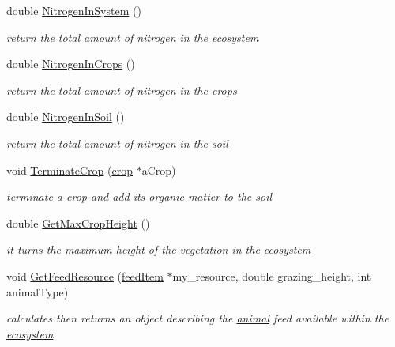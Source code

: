 \begin{DoxyCompactItemize}
double \hyperlink{classecosystem_acfb7342a6031a4451c885cf8ee9b365e}{NitrogenInSystem} ()
\begin{DoxyCompactList}\small\item\em return the total amount of \hyperlink{classnitrogen}{nitrogen} in the \hyperlink{classecosystem}{ecosystem} \item\end{DoxyCompactList}\item 
double \hyperlink{classecosystem_a37510ceb9f78738a84d1155ffa592f12}{NitrogenInCrops} ()
\begin{DoxyCompactList}\small\item\em return the total amount of \hyperlink{classnitrogen}{nitrogen} in the crops \item\end{DoxyCompactList}\item 
double \hyperlink{classecosystem_a8ffb63ec540734dcba14fd0d74ba7d14}{NitrogenInSoil} ()
\begin{DoxyCompactList}\small\item\em return the total amount of \hyperlink{classnitrogen}{nitrogen} in the \hyperlink{classsoil}{soil} \item\end{DoxyCompactList}\item 
void \hyperlink{classecosystem_a34442a209e38774eead5221826c31a61}{TerminateCrop} (\hyperlink{classcrop}{crop} $\ast$aCrop)
\begin{DoxyCompactList}\small\item\em terminate a \hyperlink{classcrop}{crop} and add its organic \hyperlink{classmatter}{matter} to the \hyperlink{classsoil}{soil} \item\end{DoxyCompactList}\item 
double \hyperlink{classecosystem_a10bf498ff7059db7f8a37a057e8924c4}{GetMaxCropHeight} ()
\begin{DoxyCompactList}\small\item\em it turns the maximum height of the vegetation in the \hyperlink{classecosystem}{ecosystem} \item\end{DoxyCompactList}\item 
void \hyperlink{classecosystem_a93d176ab8d86edc9eca29a1d831648c4}{GetFeedResource} (\hyperlink{classfeed_item}{feedItem} $\ast$my\_\-resource, double grazing\_\-height, int animalType)
\begin{DoxyCompactList}\small\item\em calculates then returns an object describing the \hyperlink{classanimal}{animal} feed available within the \hyperlink{classecosystem}{ecosystem} \item\end{DoxyCompactList}\item 

\end{DoxyCompactItemize}
